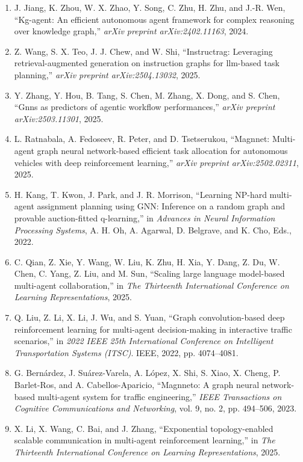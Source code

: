 \documentclass[10pt,UTF8,fontset=fandol]{ctexart}
\begin{document}
\begin{enumerate}[leftmargin=2.4em,labelsep=0.4em,itemsep=0.15em]
\item J. Jiang, K. Zhou, W. X. Zhao, Y. Song, C. Zhu, H. Zhu, and J.-R. Wen, ``Kg-agent: An efficient autonomous agent framework for complex reasoning over knowledge graph,'' \textit{arXiv preprint arXiv:2402.11163}, 2024.
\item Z. Wang, S. X. Teo, J. J. Chew, and W. Shi, ``Instructrag: Leveraging retrieval-augmented generation on instruction graphs for llm-based task planning,'' \textit{arXiv preprint arXiv:2504.13032}, 2025.
\item Y. Zhang, Y. Hou, B. Tang, S. Chen, M. Zhang, X. Dong, and S. Chen, ``Gnns as predictors of agentic workflow performances,'' \textit{arXiv preprint arXiv:2503.11301}, 2025.
\item L. Ratnabala, A. Fedoseev, R. Peter, and D. Tsetserukou, ``Magnnet: Multi-agent graph neural network-based efficient task allocation for autonomous vehicles with deep reinforcement learning,'' \textit{arXiv preprint arXiv:2502.02311}, 2025.
\item H. Kang, T. Kwon, J. Park, and J. R. Morrison, ``Learning NP-hard multi-agent assignment planning using GNN: Inference on a random graph and provable auction-fitted q-learning,'' in \textit{Advances in Neural Information Processing Systems}, A. H. Oh, A. Agarwal, D. Belgrave, and K. Cho, Eds., 2022.
\item C. Qian, Z. Xie, Y. Wang, W. Liu, K. Zhu, H. Xia, Y. Dang, Z. Du, W. Chen, C. Yang, Z. Liu, and M. Sun, ``Scaling large language model-based multi-agent collaboration,'' in \textit{The Thirteenth International Conference on Learning Representations}, 2025.
\item Q. Liu, Z. Li, X. Li, J. Wu, and S. Yuan, ``Graph convolution-based deep reinforcement learning for multi-agent decision-making in interactive traffic scenarios,'' in \textit{2022 IEEE 25th International Conference on Intelligent Transportation Systems (ITSC)}. IEEE, 2022, pp. 4074--4081.
\item G. Bernárdez, J. Suárez-Varela, A. López, X. Shi, S. Xiao, X. Cheng, P. Barlet-Ros, and A. Cabellos-Aparicio, ``Magnneto: A graph neural network-based multi-agent system for traffic engineering,'' \textit{IEEE Transactions on Cognitive Communications and Networking}, vol. 9, no. 2, pp. 494--506, 2023.
\item X. Li, X. Wang, C. Bai, and J. Zhang, ``Exponential topology-enabled scalable communication in multi-agent reinforcement learning,'' in \textit{The Thirteenth International Conference on Learning Representations}, 2025.

\end{enumerate}
\end{document}
